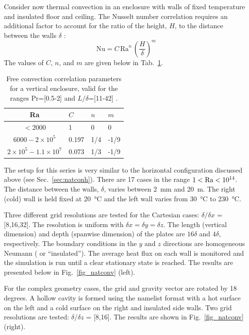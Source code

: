 \documentclass[11pt]{book}
\begin{document}
Consider now thermal convection in an enclosure with walls of fixed temperature and insulated floor and ceiling.  The Nusselt number correlation requires an additional factor to account for the ratio of the height, $H$, to the distance between the walls $\delta$ \cite{Holman:2}:
\begin{equation}
\mathrm{Nu} = C \,\mathrm{Ra}^n \,\left(\frac{H}{\delta}\right)^m
\end{equation}
The values of $C$, $n$, and $m$ are given below in Tab.~\ref{tab:freeconv}.
\begin{table}[ht]
\centering
\caption[Free convection correlation parameters for a vertical enclosure]{Free convection correlation parameters for a vertical enclosure, valid for the ranges Pr=[0.5-2] and $L/\delta$=[11-42] \cite{Holman:2}.}
\label{tab:freeconv}
\begin{tabular}{clll}
Ra                                   & $C$    & $n$ & $m$  \\
\hline
$<2000$                              & 1      & 0   & 0    \\
$6000 - 2 \times 10^5$               & 0.197  & 1/4 & -1/9 \\
$2 \times 10^5 - 1.1 \times 10^7$    & 0.073  & 1/3 & -1/9
\end{tabular}
\end{table}
The setup for this series is very similar to the horizontal configuration discussed above (see Sec.~\ref{sec:natconh}). There are 17 cases in the range $1 < {\rm Ra} < 10^{14}$.  The distance between the walls, $\delta$, varies between 2~mm  and 20~m. The right (cold) wall is held fixed at 20~\unit{\degreeCelsius} and the left wall varies from 30~\unit{\degreeCelsius} to 230~\unit{\degreeCelsius}.

Three different grid resolutions are tested for the Cartesian cases: $\delta/\delta x$ = [8,16,32].  The resolution is uniform with $\delta x = \delta y = \delta z$.  The length (vertical dimension) and depth (spanwise dimension) of the plates are $16 \delta$ and $4 \delta$, respectively.  The boundary conditions in the $y$ and $z$ directions are homogeneous Neumann ( or ``insulated'').  The average heat flux on each wall is monitored and the simulation is run until a clear stationary state is reached.  The results are presented below in Fig.~\ref{fig_natconv} (left).

For the complex geometry cases, the grid and gravity vector are rotated by 18 degrees.  A hollow cavity is formed using the  namelist format with a hot surface on the left and a cold surface on the right and insulated side walls.  Two grid resolutions are tested: $\delta/\delta z$ = [8,16].  The results are shown in Fig.~\ref{fig_natconv} (right).
\end{document}
